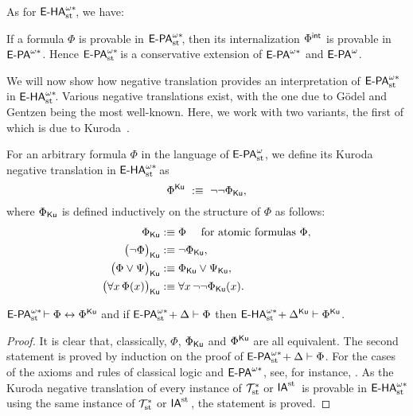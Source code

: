 As for $\ehaststar$, we have:
\begin{prop}
If a formula $\Phi$ is provable in $\epaststar$, then its internalization $\Phi^{\intern}$ is provable in $\epastar$. Hence $\epaststar$ is a conservative extension of $\epastar$ and $\epa$.
\end{prop}

We will now show how negative translation provides an interpretation of $\epaststar$ in $\ehaststar$. Various negative translations exist, with the one due to G\"odel and Gentzen being the most well-known. Here, we work with two variants, the first of which is due to Kuroda~\cite{Kuroda51}.

\begin{dfn}
For an arbitrary formula $\Phi$ in the language of $\epast$, we define
its Kuroda negative translation in $\ehaststar$ as
\[
\Phi^\ku\ :\equiv\ \neg\neg\Phi_\ku,
\]
where $\Phi_\ku$ is defined inductively on the structure of $\Phi$ as follows:
\begin{align*}
 \Phi_\ku   &:\equiv \Phi\quad \text { for atomic formulas $\Phi$}, \\
 \big(\neg\Phi\big)_\ku  &:\equiv \neg\Phi_\ku,\\
 \big(\Phi\vee\Psi\big)_\ku  &:\equiv  \Phi_\ku\vee \Psi_\ku,\\
 \big(\forall x \, \Phi(x)\big)_\ku  &:\equiv  \forall x \, \neg\neg\Phi_\ku(x).
\end{align*}
\end{dfn}

\begin{thm} \label{soundnesskuroda} $\epaststar \vdash \Phi \leftrightarrow \Phi^\ku$ and if $\epaststar + \Delta \vdash\Phi$ then $\ehaststar + \Delta^\ku \vdash\Phi^\ku$.
\end{thm}
\begin{proof}
It is clear that, classically, $\Phi$, $\Phi_\ku$ and $\Phi^\ku$ are all equivalent. The second statement is proved by induction on the proof of $\epaststar + \Delta \vdash\Phi$. For the cases of the axioms and rules of classical logic and $\epastar$, see, for instance, \cite[Proposition 10.3]{Kohlenbach08}. As the Kuroda negative translation of every instance of $\Tst$ or $\IA^{\st{}}$ is provable in $\ehaststar$ using the same instance of $\Tst$ or $\IA^{\st{}}$, the statement is proved.
\end{proof}

